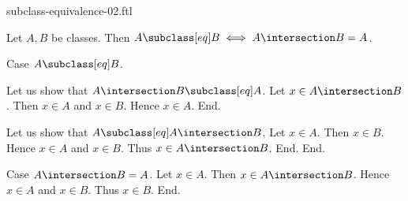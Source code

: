 \documentclass{article}
\begin{document}
\begin{smodule}[creators={Marcel Schütz}]{subclass-equivalence-02.ftl}

  \begin{fproposition*}[label=4268206566932480]
    Let $A, B$ be classes.
    Then $A \subclass[eq] B \iff A \intersection B = A$.
  \end{fproposition*}
  \begin{fproof}
    Case $A \subclass[eq] B$.

      Let us show that $A \intersection B \subclass[eq] A$.
        Let $x \in A \intersection B$.
        Then $x \in A$ and $x \in B$.
        Hence $x \in A$.
      End.

      Let us show that $A \subclass[eq] A \intersection B$.
        Let $x \in A$.
        Then $x \in B$.
        Hence $x \in A$ and $x \in B$.
        Thus $x \in A \intersection B$.
      End.
    End.

    Case $A \intersection B = A$.
      Let $x \in A$.
      Then $x \in A \intersection B$.
      Hence $x \in A$ and $x \in B$.
      Thus $x \in B$.
    End.
  \end{fproof}
\end{smodule}
\end{document}
